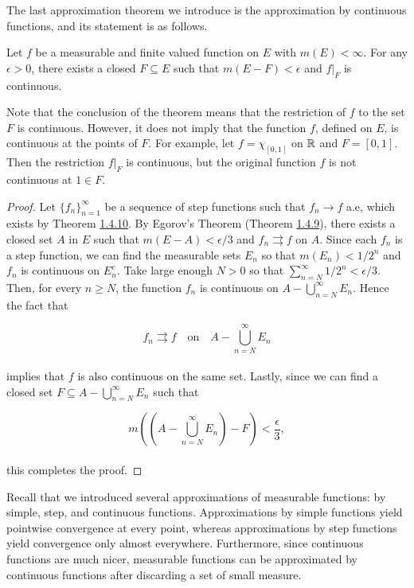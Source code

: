\documentclass[12pt, a4paper, openany, twoside]{book}
\theoremstyle{definition}
\theoremstyle{remark}
\theoremstyle{plain}
\numberwithin{equation}{section}
\begin{document}
The last approximation theorem we introduce is the approximation by continuous functions, and its statement is as follows.

\vspace{5mm}
\begin{tcolorbox}[colback=yellow!10!white,colframe=red!75!black,title=Theorem 1.4.11 (Lusin's Theorem)]\label{Theorem 1.4.11}
    Let $f$ be a measurable and finite valued function on $E$ with $m(E)<\infty$. For any $\epsilon>0$, there exists a closed $F\subseteq E$ such that $m(E-F)<\epsilon$ and $f|_F$ is continuous.
\end{tcolorbox}
\vspace{5mm}

Note that the conclusion of the theorem means that the restriction of $f$ to the set $F$ is continuous. However, it does not imply that the function $f$, defined on $E$, is continuous at the points of $F$. For example, let $f=\chi_{[0,1]}$ on ${\mathbb {R}}$ and $F=[0,1]$. Then the restriction $f|_F$ is continuous, but the original function $f$ is not continuous at $1\in F$.

\vspace{5mm}
\begin{proof}
    Let $\{f_n\}_{n=1}^{\infty}$ be a sequence of step functions such that $f_n\rightarrow f$ a.e, which exists by Theorem \hyperref[Theorem 1.4.10]{1.4.10}. By Egorov's Theorem (Theorem \hyperref[Theorem 1.4.9]{1.4.9}), there exists a closed set $A$ in $E$ such that $m(E-A)<\epsilon/3$ and $f_n\rightrightarrows f$ on $A$. Since each $f_n$ is a step function, we can find the measurable sets $E_n$ so that $m(E_n)<1/2^n$ and $f_n$ is continuous on $E_n^c$. Take large enough $N>0$ so that $\sum_{n=N}^{\infty}{1/2^n}<\epsilon/3$. Then, for every $n\geq N$, the function $f_n$ is continuous on $A-\bigcup_{n=N}^{\infty}{E_n}$. Hence the fact that 
    
    \[f_n\rightrightarrows f\quad\text{on}\quad A-\bigcup_{n=N}^{\infty}{E_n}\]
    \\
    implies that $f$ is also continuous on the same set. Lastly, since we can find a closed set $F\subseteq A-\bigcup_{n=N}^{\infty}{E_n}$ such that

    \[m\left(\left(A-\bigcup_{n=N}^{\infty}{E_n}\right)-F\right)<\frac{\epsilon}{3},\]
    \\
    this completes the proof.
\end{proof}
\vspace{5mm}

Recall that we introduced several approximations of measurable functions: by simple, step, and continuous functions. Approximations by simple functions yield pointwise convergence at every point, whereas approximations by step functions yield convergence only almost everywhere. Furthermore, since continuous functions are much nicer, measurable functions can be approximated by continuous functions after discarding a set of small measure.
\end{document}
